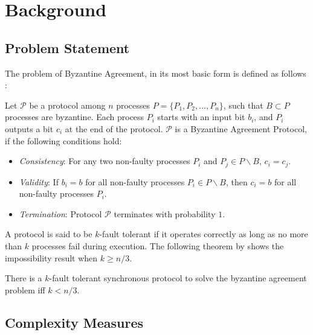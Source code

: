 ﻿\section{Background}
\label{sec:background}

\subsection{Problem Statement}
The problem of Byzantine Agreement, in its most basic form is defined as follows \cite{PeaseSL80}:

\begin{definition}
    Let $\mathcal{P}$ be a protocol among $n$ processes $P = \{ P_1, P_2, \dots, P_n\}$, such that $B \subset P$ processes are byzantine. Each process $P_i$ starts with an input bit $b_i$, and $P_i$ outputs a bit $c_i$ at the end of the protocol. $\mathcal{P}$ is a Byzantine Agreement Protocol, if the following conditions hold:
\begin{itemize}
    \item \textit{Consistency}: For any two non-faulty processes $P_i$ and $P_j \in P \backslash B$, $c_i = c_j$.
    \item \textit{Validity}: If $b_i = b$ for all non-faulty processes $P_i \in P \backslash B$, then $c_i = b$ for all non-faulty processes $P_i$.
    \item \textit{Termination}: Protocol $\mathcal{P}$ terminates with probability $1$.
\end{itemize}
\end{definition}

A protocol is said to be $k$-fault tolerant if it operates correctly as long as no more than $k$ processes fail during execution. The following theorem by \cite{LamportSP82,PeaseSL80} shows the impossibility result when $k \geq n/3$.

\begin{theorem}
There is a $k$-fault tolerant synchronous protocol to solve the byzantine agreement problem iff $k < n/3$.
\hfill \qedsymbol
\end{theorem}

\subsection{Complexity Measures}

